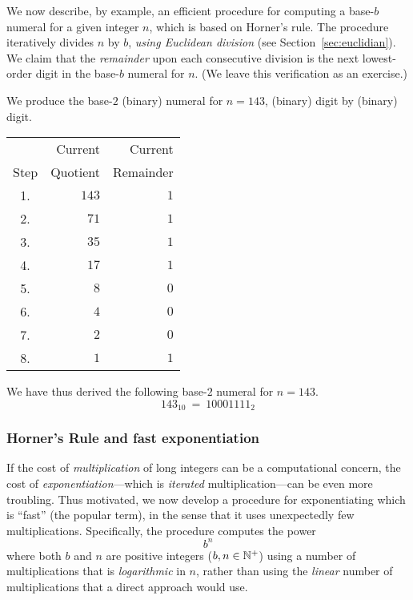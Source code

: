 \bigskip

\noindent
We now describe, by example, an efficient procedure for computing a base-$b$ numeral for a given integer $n$, which is based on Horner's rule.  The procedure iteratively divides $n$ by $b$, {\em using Euclidean division} (see Section~\ref{sec:euclidian}).  We claim that the {\em remainder} upon each consecutive division is the next lowest-order digit in the base-$b$ numeral for $n$.  (We leave this verification as an exercise.)

\bigskip

We produce the base-$2$ (binary) numeral for $n = 143$, (binary) digit
by (binary) digit.

\bigskip

\hspace*{.35in}
\begin{tabular}{|c|r|r|}
\hline
         & Current  & Current \\
Step & Quotient & Remainder \\
\hline
1. & $143$ & $1$ \\
2. & $71$  & $1$ \\
3. & $35$  & $1$ \\
4. & $17$  & $1$ \\
5. & $8$   & $0$ \\
6. & $4$   & $0$ \\
7. & $2$   & $0$ \\
8. & $1$   & $1$ \\
\hline
\end{tabular}

\bigskip

\noindent
We have thus derived the following base-$2$ numeral for $n = 143$.
\[ 143_{10} \ = \ 10001111_2 \]


\subsubsection{Horner's Rule and fast exponentiation} 

If the cost of {\em multiplication} of long integers can be a computational concern, the cost of {\em exponentiation}---which is {\em iterated} multiplication---can be even more troubling.  Thus motivated, we now develop a procedure for exponentiating which is ``fast'' (the popular term), in the sense that it uses unexpectedly few multiplications.  Specifically, the procedure computes the power
\[ b^n \]
where both $b$ and $n$ are positive integers ($b, n \in \mathbb{N}^+$) using a number of multiplications that is {\em logarithmic} in $n$, rather than using the {\em linear} number of multiplications that a direct approach would use.

